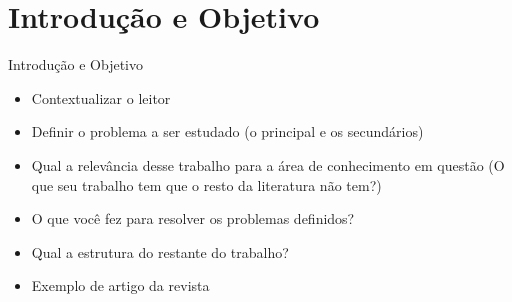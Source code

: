 \section{Introdução e Objetivo}

\begin{frame}	
	\begin{block}{Introdução e Objetivo}
		 \begin{itemize}
			  \item Contextualizar o leitor			
			  \item Definir o problema a ser estudado (o principal e os secundários)
			  \item Qual a relevância desse trabalho para a área de conhecimento em questão (O que seu trabalho tem que o resto da literatura não tem?)
			  \item O que você fez para resolver os problemas definidos?
			  \item Qual a estrutura do restante do trabalho?
			  \item Exemplo de artigo da revista \href{https://www.nature.com/scitable/topicpage/scientific-papers-13815490}{\color{blue}{Nature}} \cite{NATURE_2018}
		  \end{itemize}
	\end{block}
\end{frame}
